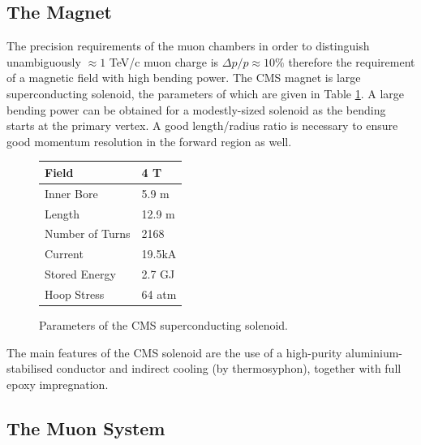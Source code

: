 \subsection{The Magnet}

The precision requirements of the muon chambers in order to distinguish unambiguously $\approx 1$ TeV/c muon charge is $\Delta p / p \approx 10\%$ therefore the requirement of a magnetic field with high bending power.
The CMS magnet is large superconducting solenoid, the parameters of which are given in Table \ref{table:CMS_magnet}. A large bending power can be obtained for a modestly-sized solenoid as the bending starts at the primary vertex. A good length/radius ratio is necessary to ensure good momentum resolution in the forward region as well.

\begin{figure}[tbh!]
	\begin{center}
	
		\begin{tabular}{ | l | l |}
			\hline
			Field & 4 T \\ \hline
			Inner Bore & 5.9 m \\ \hline
			Length & 12.9 m \\ \hline
			Number of Turns & 2168  \\ \hline
			Current & 19.5kA   \\ \hline
			Stored Energy & 2.7 GJ  \\ \hline
			Hoop Stress & 64 atm \\
			\hline
		\end{tabular}
		\caption{Parameters of the CMS superconducting solenoid.}
		\label{table:CMS_magnet}
			\end{center}
	\end{figure}

The main features of the CMS solenoid are the use of a high-purity aluminium-stabilised conductor and indirect cooling (by thermosyphon), together with full epoxy impregnation.


\subsection{The Muon System}

